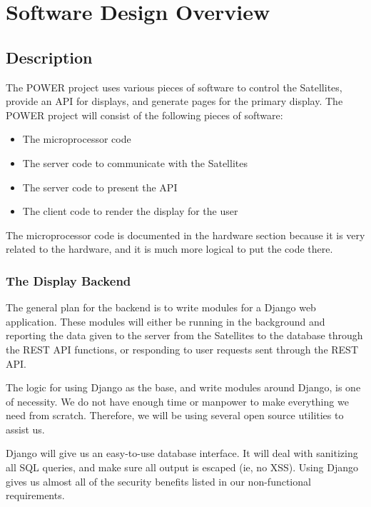 
\chapter{Software Design Overview}

\section{Description}

The POWER project uses various pieces of software to control the Satellites, provide an API for displays, and generate pages for the primary display.
The POWER project will consist of the following pieces of software:
\begin{itemize}
 \item The microprocessor code
 \item The server code to communicate with the Satellites
 \item The server code to present the API
 \item The client code to render the display for the user
\end{itemize}

The microprocessor code is documented in the hardware section because it is very related to the hardware, and it is much more logical to put the  code there.

\subsection{The Display Backend}

The general plan for the backend is to write modules for a Django web application.
These modules will either be running in the background and reporting the data given to the server from the Satellites to the database through the REST API functions, or responding to user requests sent through the REST API.

The logic for using Django as the base, and write modules around Django, is one of necessity.
We do not have enough time or manpower to make everything we need from scratch.
Therefore, we will be using several open source utilities to assist us.


Django will give us an easy-to-use database interface.
It will deal with sanitizing all SQL queries, and make sure all output is escaped (ie, no XSS).
Using Django gives us almost all of the security benefits listed in our non-functional requirements.

